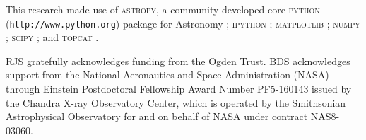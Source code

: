 \documentclass[usenatbib]{mn2e}
\begin{document}
This research made use of \textsc{astropy}, a community-developed core \textsc{python} ({\tt http://www.python.org}) package for Astronomy \citep{2013A&A...558A..33A}; \textsc{ipython} \citep{PER-GRA:2007}; \textsc{matplotlib} \citep{Hunter:2007}; \textsc{numpy} \citep{:/content/aip/journal/cise/13/2/10.1109/MCSE.2011.37}; \textsc{scipy} \citep{citescipy}; and \textsc{topcat} \citep{2005ASPC..347...29T}.

RJS gratefully acknowledges funding from the Ogden Trust. BDS acknowledges support from the National Aeronautics and Space Administration (NASA) through Einstein Postdoctoral Fellowship Award Number PF5-160143 issued by the Chandra X-ray Observatory Center, which is operated by the Smithsonian Astrophysical Observatory for and on behalf of NASA under contract NAS8-03060.

{}

\end{document}
